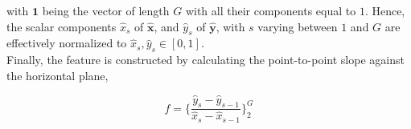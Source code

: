 \noindent with $\textbf{1}$ being the vector of length $G$ with all their components equal to $1$.  Hence, the scalar components $\hat{x}_{s}$ of $\hat{\textbf{x}}$, and $\hat{y}_{s}$ of $\hat{\textbf{y}}$, with $s$ varying between $1$ and $G$ are effectively normalized to $\hat{x}_{s},\hat{y}_{s} \in [0,1]$. \\

Finally, the feature is constructed by calculating the point-to-point slope against the horizontal plane,

\begin{equation}
f = \bigg \{  \frac{\hat{y}_{s}-\hat{y}_{s-1}}{\hat{x}_{s}-\hat{x}_{s-1}}  \bigg \}_{2}^{G} 
\label{eq:shcc8}
\end{equation}


